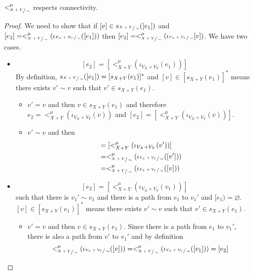 \begin{lemma}
\label{lemma:child_respect}
    $<_{\sfrac{X+Y}{\sim}}^{\mu}$ respects connectivity.
\end{lemma}
\begin{proof}
        We need to show that if $[v] \in s_{\sfrac{X+Y}{\sim}}([e_1])$ and $[e_2] = <_{\sfrac{X+Y}{\sim}}^{\mu}(\iota_{\sfrac{E_{X} + E_{Y}}{\sim}}([e_1]))$ then $[e_2] = <_{\sfrac{X+Y}{\sim}}^{\mu}(\iota_{\sfrac{V_{X} + V_{Y}}{\sim}}[v])$.
        We have two cases.
        \begin{itemize}
            \item \[
            [e_2] = [<_{X+Y}^{\mu}(\iota_{V_{X} + V_{Y}}(e_1))]
            \]
            By definition, $s_{\sfrac{X+Y}{\sim}}([e_1]) = [s_{X+Y}(e_1)]^{*}$ and $[v] \in [s_{X+Y}(e_1)]^{*}$ means there exists $v' \sim v$ such that $v' \in s_{X+Y}(e_1)$.
            \begin{itemize}
                \item $v' = v$ and then $v \in s_{X+Y}(e_1)$ and therefore $e_2 = <_{X+Y}^{\mu}(\iota_{V_{X} + V_{Y}}(v))$ and $[e_2] = [<_{X+Y}^{\mu}(\iota_{V_{X} + V_{Y}}(v))]$.
                \item $v' \sim v$ and then 
                \begin{align*}
                    [e_2] &= [<_{X+Y}^{\mu}(\iota_{V_{X} + V_{Y}}(v'))]\\
                          &= <_{\sfrac{X+Y}{\sim}}^{\mu}(\iota_{\sfrac{V_{X} + V_{Y}}{\sim}}([v']))\\
                          &= <_{\sfrac{X+Y}{\sim}}^{\mu}(\iota_{\sfrac{V_{X} + V_{Y}}{\sim}}([v]))
                \end{align*}
            \end{itemize}
            \item \[
                [e_2] = [<_{X+Y}^{\mu}(\iota_{V_{X} + V_{Y}}(v_1))]    
            \]
            such that there is $v_1' \sim v_1$ and there is a path from $e_1$ to $v_1'$ and $[e_1) = \varnothing$.
            $[v] \in [s_{X+Y}(e_1)]^{*}$ means there exists $v' \sim v$ such that $v' \in s_{X+Y}(e_1)$.
            \begin{itemize}
                \item $v' = v$ and then $v \in s_{X+Y}(e_1)$. Since there is a path from $e_1$ to $v_1'$, there is also a path from $v'$ to $v_1'$ and by definition
                \[
                    <_{\sfrac{X+Y}{\sim}}^{\mu}(\iota_{\sfrac{V_{X} + V_{Y}}{\sim}}([v])) = <_{\sfrac{X+Y}{\sim}}^{\mu}(\iota_{\sfrac{V_{X} + V_{Y}}{\sim}}([v_1])) = [e_2]
\]
\end{itemize}
\end{itemize}
\end{proof}
